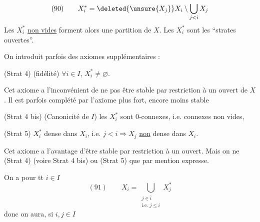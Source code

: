 
\[(90)\qquad X_i^*=\deleted{\unsure{X_j}}X_i\setminus\bigcup_{j<i}X_j\]
Les $X_i^*$ \uline{non vides} forment alors une partition de $X$. Les $X_i^*$ sont les ``strates ouvertes''.

On introduit parfois des axiomes supplémentaires :

(Strat 4) (fidélité) $\forall i\in I$, $X_i^*\neq\varnothing$.

Cet axiome a l'inconvénient de ne pas être stable par  restriction à un ouvert de $X$. Il est parfois complété par l'axiome plus fort, encore moins stable

(Strat 4 bis) (Canonicité de $I$) les $X_i^*$ sont $0$-connexes, i.e. connexes non vides,

(Strat 5)  $X_i^*$ dense dans $X_i$,  i.e. $j<i\Rightarrow X_j$ \uline{non} dense dans $X_i$.

Cet axiome a l'avantage d'être stable par restriction à un ouvert. Mais on ne  (Strat 4) (voire Strat 4 bis) ou (Strat 5) que par mention expresse.

On a pour tt $i\in I$
\[
(91)\qquad X_i=\bigcup_{\substack{j\in\bar i\\\text{i.e. }j\leq i}}X_j^*
\]
donc on aura, si $i,j\in I$
